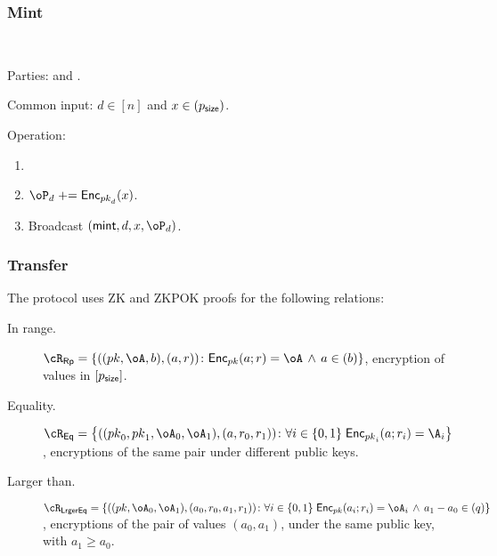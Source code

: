 \subsubsection{Mint}

\begin{protocol}~\label{prot:ConfidentialTransactions:Mint}
	\item[Parties:] \Mc and \Cc.
	
	
	
	\item[Common input:]  $d\in [n]$ and $x\in (p_{\mathsf{size}})$.
	
	\item[Operation:]  \Cc~
		\begin{enumerate}
			\item {}
			
			\item  $\oP_d \pluseq \Enc_{\pk_d}(x)$.
				
			
			\item Broadcast 	 	$(\mint,d,x,\oP_d)$.
		
	\end{enumerate}
\end{protocol}

\subsubsection{Transfer}

The protocol uses ZK and ZKPOK proofs for the   following  relations:

\begin{description}
	\item[In range.] $\rRp =\rRpDef$, \ie  encryption of values in $[p_{\mathsf{size}}]$.
	
	\item[Equality.] $\rEq =\rEqDef$, \ie  encryptions of the same pair under different public keys.
	
	\item[Larger than.] $\rLrgEq =\rLrgEqDef$, \ie encryptions of the  pair of values $(a_0,a_1)$, under the same public key, with $a_1 \ge a_0$.
\end{description}




